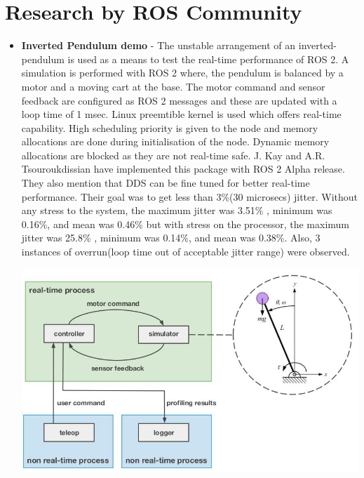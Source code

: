 \documentclass[%
xelatex,
	oneside,		%
	12pt,			%
	parskip=half,	%
	abstracton,
	chapterprefix=true%
    appendixprefix=true]
{scrbook}
\begin{document}
	\section{Research by ROS Community}
\vspace*{0.5cm}
\begin{itemize}
\item {\bfseries Inverted Pendulum demo} - The unstable arrangement of an inverted-pendulum is used as a means to test  the real-time performance of ROS 2. A simulation is performed with ROS 2 where, the pendulum is balanced by a motor and a moving cart at the base. The motor command and sensor feedback are configured as ROS 2 messages and these are updated with a loop time of 1 msec. Linux preemtible kernel is used which offers real-time capability. High scheduling priority is given to the node and memory allocations are done during initialisation of the node. Dynamic memory allocations are blocked as they are not real-time safe. J. Kay and A.R. Tsouroukdissian have implemented this package with ROS 2 Alpha release. They also mention that DDS can be fine tuned for better real-time performance. Their goal was to get less than 3\%(30 microsecs) jitter. Without any stress to the system, the maximum jitter was 3.51\% , minimum was 0.16\%, and mean was 0.46\% but with stress on the processor, the maximum jitter was 25.8\% , minimum was 0.14\%, and mean was 0.38\%. Also, 3 instances of overrun(loop time out of acceptable jitter range) were observed.
	\begin{center}
\includegraphics[scale=0.5]{fig/inverted.jpg}


\end{center}
\end{itemize}
\end{document}
